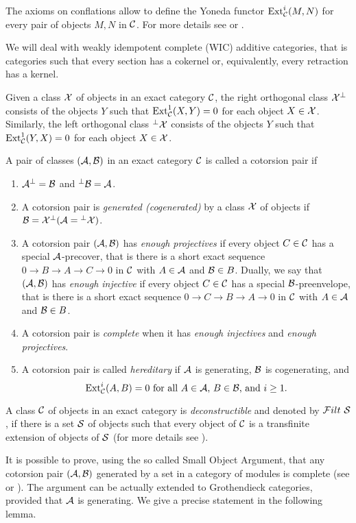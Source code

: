 The axioms on conflations allow to define the Yoneda functor $\operatorname{Ext}^i_{\mathcal{C}}(M,N)$ for every pair of objects $M,N$
 in $\mathcal{C}$.
For more details see \cite{Kel90} or \cite{Bu}.

We will deal with weakly idempotent complete (WIC) additive categories, that is categories such that every section has a cokernel or, equivalently, every retraction has a kernel.

Given a class $\mathcal{X}$ of objects in an exact category $\mathcal{C}$, the right orthogonal class $\mathcal{X}^{\perp}$ consists of the objects $Y$ such that $\operatorname{Ext}^1_{\mathcal{C}}(X,Y)=0$ for each object $X\in \mathcal{X}$. Similarly, the left orthogonal class $^{\perp}\mathcal{X} $ consists of the objects $Y$ such that $\operatorname{Ext}^1_{\mathcal{C}}(Y,X)=0$ for each object $X\in \mathcal{X}$.

\begin{defn}\label{D:cotorsion-pair} A pair of classes $(\mathcal{A}, \mathcal{B})$ in an exact category $\mathcal{C}$ is called a cotorsion pair if
\begin{enumerate}
\item $\mathcal{A}^{\perp}=\mathcal{B}$ and $^{\perp} \mathcal{B}=\mathcal{A}$.
\item A cotorsion pair is \emph{generated (cogenerated)} by a class $\mathcal{X}$ of objects if $\mathcal{B}=\mathcal{X}^{\perp} (\mathcal{A}={^{\perp}\mathcal{X}})$.
\item A cotorsion pair $(\mathcal{A}, \mathcal{B})$ has \emph{enough projectives} if every object $C\in \mathcal{C}$ has a special $\mathcal{A}$-precover, that is there is a short exact sequence $0\to B\to A\to C\to 0$ in $\mathcal{C}$ with $A\in \mathcal{A}$ and $\mathcal{B}\in B$. Dually, we say that  $(\mathcal{A}, \mathcal{B})$ has \emph{enough injective} if every object $C\in \mathcal{C}$ has a special $\mathcal{B}$-preenvelope, that is there is a short exact sequence $0\to C\to B\to A\to 0$ in $\mathcal{C}$ with $A\in \mathcal{A}$ and $\mathcal{B}\in B$.
\item A cotorsion pair is \emph{complete} when it has \emph{enough injectives} and \emph{enough projectives}.
\item A cotorsion pair is called \emph{hereditary} if $\mathcal{A}$ is generating, $\mathcal{B}$ is cogenerating, and
  \[ \operatorname{Ext}^i_{\mathcal{C}}(A,B)=0 \text{ for all }A\in \mathcal{A}\text{, }B\in \mathcal{B}\text{, and } i\geq 1. \]
\end{enumerate}
\end{defn}
A class $\mathcal{C}$ of objects in an exact category is \emph{deconstructible} and denoted by $\mathcal{F} ilt\ \mathcal{S}$, if there is a set $\mathcal{S}$ of objects such that every object of $\mathcal{C}$ is a transfinite extension of objects of $\mathcal{S}$ (for more details see \cite[Definition 3.7 and 3.10]{Sto13}).

It is possible to prove, using the so called Small Object Argument, that any cotorsion pair $(\mathcal{A},\mathcal{B})$ generated by a set in a category of modules is complete (see \cite{Q} or \cite{ET01}). The argument can be actually extended to Grothendieck categories, provided that $\mathcal{A}$ is generating. We give a precise statement in the following lemma.

